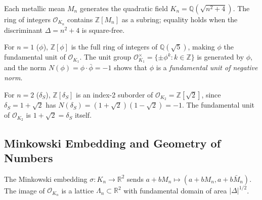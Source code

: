 Each metallic mean $M_n$ generates the quadratic
field $K_n = \mathbb{Q}(\sqrt{n^2+4})$.
The ring of integers $\mathcal{O}_{K_n}$ contains
$\mathbb{Z}[M_n]$ as a subring; equality holds
when the discriminant $\Delta = n^2 + 4$ is
square-free.

\begin{table}[H]
\centering
\caption{Quadratic fields for small metallic means.}
\label{tab:metallic-fields}
\end{table}

For $n = 1$ ($\phi$), $\mathbb{Z}[\phi]$ is the
full ring of integers of $\mathbb{Q}(\sqrt{5})$,
making $\phi$ the fundamental unit of $\mathcal{O}_{K_1}$.
The unit group $\mathcal{O}_{K_1}^\times = \{\pm \phi^k : k \in \mathbb{Z}\}$
is generated by $\phi$, and the norm
$N(\phi) = \phi \cdot \bar\phi = -1$ shows that
$\phi$ is a \emph{fundamental unit of negative norm}.

For $n = 2$ ($\delta_S$), $\mathbb{Z}[\delta_S]$
is an index-2 suborder of $\mathcal{O}_{K_2} = \mathbb{Z}[\sqrt{2}]$,
since $\delta_S = 1 + \sqrt{2}$ has
$N(\delta_S) = (1+\sqrt{2})(1-\sqrt{2}) = -1$.
The fundamental unit of $\mathcal{O}_{K_2}$ is
$1 + \sqrt{2} = \delta_S$ itself.

\subsection{Minkowski Embedding and Geometry of Numbers}
\label{subsec:minkowski}

The Minkowski embedding $\sigma: K_n \to \mathbb{R}^2$
sends $a + bM_n \mapsto (a + bM_n, a + b\bar{M}_n)$.
The image of $\mathcal{O}_{K_n}$ is a lattice
$\Lambda_n \subset \mathbb{R}^2$ with
fundamental domain of area $|\Delta|^{1/2}$.

